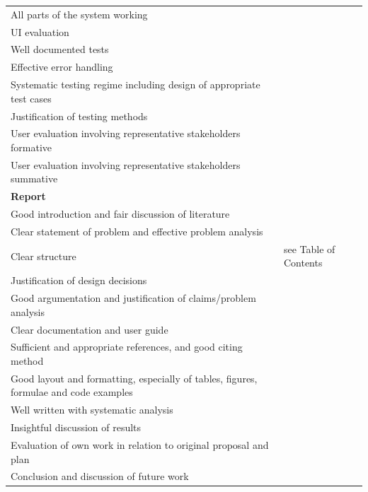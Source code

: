 \begin{table}[H]
\begin{tabular}{@{}m{10cm}!{\qquad}m{5cm}@{}}
	All parts of the system working                                  &       \\
	UI evaluation                                                    &       \\
	Well documented tests                                            &         \\
	Effective error handling                                         &                             \\
	Systematic testing regime including design of appropriate test cases &     \\
	Justification of testing methods                                 &        \\
	User evaluation involving representative stakeholders formative  &         \\
	User evaluation involving representative stakeholders summative  &      \\
	\textbf{Report}                                               &                                \\
	Good introduction and fair discussion of literature              &        \\
	Clear statement of problem and effective problem analysis        &        \\
	Clear structure                                                  &     see Table of Contents      \\
	Justification of design decisions                                &        \\
	Good argumentation and justification of claims/problem analysis  &          \\
	Clear documentation and user guide                               &           \\
	Sufficient and appropriate references, and good citing method    &                             \\
	Good layout and formatting, especially of tables, figures, formulae and code examples          &  \\
	Well written with systematic analysis                            &                             \\
	Insightful discussion of results                                 &                             \\
	Evaluation of own work in relation to original proposal and plan &                             \\
	Conclusion and discussion of future work                         &                             \\ \bottomrule
	\end{tabular}
\end{table}


